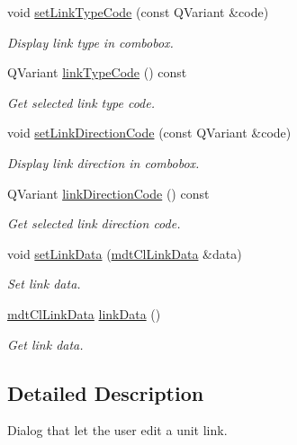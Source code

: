\begin{DoxyCompactItemize}
void \hyperlink{classmdt_cl_unit_link_dialog_a34ab2fabffeb5b889be8db9ac08add22}{set\-Link\-Type\-Code} (const Q\-Variant \&code)
\begin{DoxyCompactList}\small\item\em Display link type in combobox. \end{DoxyCompactList}\item 
Q\-Variant \hyperlink{classmdt_cl_unit_link_dialog_aa7d8b93582d68113b6d00922e4979e78}{link\-Type\-Code} () const 
\begin{DoxyCompactList}\small\item\em Get selected link type code. \end{DoxyCompactList}\item 
void \hyperlink{classmdt_cl_unit_link_dialog_a23220c3ea0f051e9155ee9a2a052b5ea}{set\-Link\-Direction\-Code} (const Q\-Variant \&code)
\begin{DoxyCompactList}\small\item\em Display link direction in combobox. \end{DoxyCompactList}\item 
Q\-Variant \hyperlink{classmdt_cl_unit_link_dialog_a4ed022bb559da23be2d192b9e83c40e2}{link\-Direction\-Code} () const 
\begin{DoxyCompactList}\small\item\em Get selected link direction code. \end{DoxyCompactList}\item 
void \hyperlink{classmdt_cl_unit_link_dialog_a43ee4d2a395f42dcaa2667170e5ad0bc}{set\-Link\-Data} (\hyperlink{classmdt_cl_link_data}{mdt\-Cl\-Link\-Data} \&data)
\begin{DoxyCompactList}\small\item\em Set link data. \end{DoxyCompactList}\item 
\hyperlink{classmdt_cl_link_data}{mdt\-Cl\-Link\-Data} \hyperlink{classmdt_cl_unit_link_dialog_a9553b27b636bec6af4139afa11a5a2db}{link\-Data} ()
\begin{DoxyCompactList}\small\item\em Get link data. \end{DoxyCompactList}\end{DoxyCompactItemize}


\subsection{Detailed Description}
Dialog that let the user edit a unit link. 

